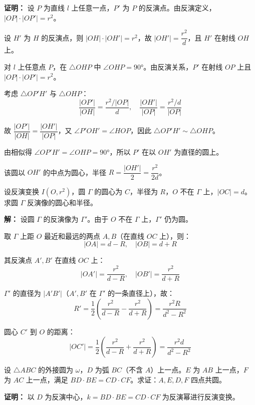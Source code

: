 \documentclass[12pt, a4paper]{ctexart}
\begin{document}
\textbf{证明：} 设 $P$ 为直线 $l$ 上任意一点，$P'$ 为 $P$ 的反演点。由反演定义，$|OP| \cdot |OP'| = r^2$。

设 $H'$ 为 $H$ 的反演点，则 $|OH| \cdot |OH'| = r^2$，故 $|OH'| = \dfrac{r^2}{d}$，且 $H'$ 在射线 $OH$ 上。

对 $l$ 上任意点 $P$，在 $\triangle OHP$ 中 $\angle OHP = 90°$。由反演关系，$P'$ 在射线 $OP$ 上且 $|OP| \cdot |OP'| = r^2$。

考虑 $\triangle OP'H'$ 与 $\triangle OHP$：
$$\frac{|OP'|}{|OH|} = \frac{r^2 / |OP|}{d}, \quad \frac{|OH'|}{|OP|} = \frac{r^2 / d}{|OP|}$$

故 $\dfrac{|OP'|}{|OH|} = \dfrac{|OH'|}{|OP|}$，又 $\angle P'OH' = \angle HOP$，因此 $\triangle OP'H' \sim \triangle OHP$。

由相似得 $\angle OP'H' = \angle OHP = 90°$，所以 $P'$ 在以 $OH'$ 为直径的圆上。

该圆以 $OH'$ 的中点为圆心，半径 $R = \dfrac{|OH'|}{2} = \dfrac{r^2}{2d}$。

\begin{examplebox}[【例题3】圆的反演像]
设反演变换 $I(O, r^2)$，圆 $\Gamma$ 的圆心为 $C$，半径为 $R$，$O$ 不在 $\Gamma$ 上，$|OC| = d$。求圆 $\Gamma$ 反演像的圆心和半径。
\end{examplebox}

\textbf{解：} 设圆 $\Gamma$ 的反演像为 $\Gamma'$。由于 $O$ 不在 $\Gamma$ 上，$\Gamma'$ 仍为圆。

取 $\Gamma$ 上距 $O$ 最近和最远的两点 $A, B$（在直线 $OC$ 上），则：
$$|OA| = d - R, \quad |OB| = d + R$$

其反演点 $A', B'$ 在直线 $OC$ 上：
$$|OA'| = \frac{r^2}{d - R}, \quad |OB'| = \frac{r^2}{d + R}$$

$\Gamma'$ 的直径为 $|A'B'|$（$A', B'$ 在 $\Gamma'$ 的一条直径上），故：
$$R' = \frac{1}{2}\left(\frac{r^2}{d - R} - \frac{r^2}{d + R}\right) = \frac{r^2 R}{d^2 - R^2}$$

圆心 $C'$ 到 $O$ 的距离：
$$|OC'| = \frac{1}{2}\left(\frac{r^2}{d - R} + \frac{r^2}{d + R}\right) = \frac{r^2 d}{d^2 - R^2}$$

\begin{examplebox}[【例题4】反演变换证四点共圆]
设 $\triangle ABC$ 的外接圆为 $\omega$，$D$ 为弧 $BC$（不含 $A$）上一点。$E$ 为 $AB$ 上一点，$F$ 为 $AC$ 上一点，满足 $BD \cdot BE = CD \cdot CF$。求证：$A, E, D, F$ 四点共圆。
\end{examplebox}

\textbf{证明：} 以 $D$ 为反演中心，$k = BD \cdot BE = CD \cdot CF$ 为反演幂进行反演变换。
\end{document}

